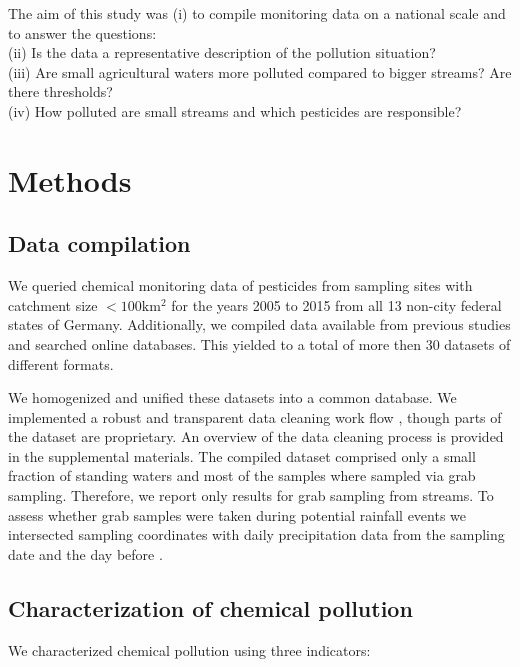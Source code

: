 \documentclass[journal=esthag,manuscript=article]{achemso}
\begin{document}




The aim of this study was 
(i) to compile monitoring data on a national scale and to answer the questions: \\
(ii) Is the data a representative description of the pollution situation? \\
(iii) Are small agricultural waters more polluted compared to bigger streams? Are there thresholds? \\
(iv)  How polluted are small streams and which pesticides are responsible?


\section{Methods}
\subsection{Data compilation}

We queried chemical monitoring data of pesticides from sampling sites with catchment size $\mathrm{< 100km^2}$ for the years 2005 to 2015 from all 13 non-city federal states of Germany.
Additionally, we compiled data available from previous studies and searched online databases.
This yielded to a total of more then 30 datasets of different formats.

We homogenized and unified these datasets into a common database.
We implemented a robust and transparent data cleaning work flow \citep{poisot_best_2015}, though parts of the dataset are proprietary.
An overview of the data cleaning process is provided in the supplemental materials.  
The compiled dataset comprised only a small fraction of standing waters and most of the samples where sampled via grab sampling.
Therefore, we report  only results for grab sampling from streams.  
To assess whether  grab samples were taken during potential rainfall events we intersected sampling coordinates with daily precipitation data \citep{rauthe_central_2013} from the sampling date and the day before .

\subsection{Characterization of chemical pollution}
We characterized chemical pollution using three indicators:
\end{document}
